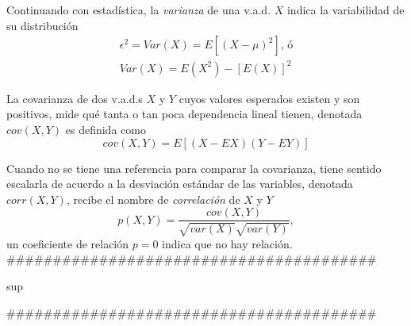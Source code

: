 Continuando con estadística, la \emph{varianza} de una v.a.d. $X$ indica la variabilidad de su distribución
\begin{equation}
\begin{matrix}
\epsilon^2=Var(X)=E[{(X-\mu)}^2]\text{, ó}\\
Var(X)=E(X^2)-{[E(X)]}^2
\end{matrix}
\end{equation}

La covarianza de dos v.a.d.s $X$ y $Y$ cuyos valores esperados existen y son positivos, mide qué tanta o tan poca dependencia lineal tienen, denotada $cov(X,Y)$ es definida como
\begin{equation}
cov(X,Y)=E[(X-EX)(Y-EY)]
\end{equation}

Cuando no se tiene una referencia para comparar la covarianza, tiene sentido escalarla de acuerdo a la desviación estándar de las variables\cite{mat17}, denotada $corr(X,Y)$, recibe el nombre de \emph{correlación} de $X$ y $Y$
\begin{equation}
p(X,Y)=\frac{cov(X,Y)}{\sqrt{var(X)}\sqrt{var(Y)}},
\end{equation}
un coeficiente de relación $p = 0$ indica que no hay relación.\\

\#\#\#\#\#\#\#\#\#\#\#\#\#\#\#\#\#\#\#\#\#\#\#\#\#\#\#\#\#\#\#\#\#\#\#\#\#\#\#\#
\begin{center}sup\end{center}

\#\#\#\#\#\#\#\#\#\#\#\#\#\#\#\#\#\#\#\#\#\#\#\#\#\#\#\#\#\#\#\#\#\#\#\#\#\#\#\#\\

